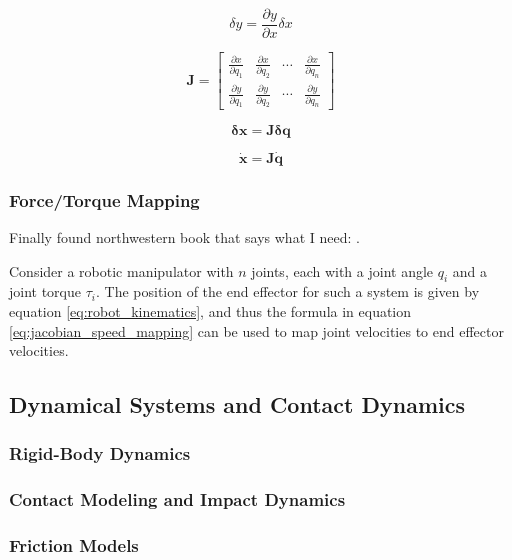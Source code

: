 \begin{equation}
    \label{eq:infinitesimal_change}
    \delta  y = \frac{\partial y}{\partial x} \delta x
\end{equation}

\begin{equation}
    \label{eq:jacobian}
    \mathbf{J} = \begin{bmatrix}
        \frac{\partial x}{\partial q_1} & \frac{\partial x}{\partial q_2} & \cdots & \frac{\partial x}{\partial q_n} \\
        \frac{\partial y}{\partial q_1} & \frac{\partial y}{\partial q_2} & \cdots & \frac{\partial y}{\partial q_n}
    \end{bmatrix}
\end{equation}

\begin{equation}
    \label{eq:jacobian_pos_mapping}
    \mathbf{\delta x} = \mathbf{J}\mathbf{\delta q}
\end{equation}

\begin{equation}
    \label{eq:jacobian_speed_mapping}
    \mathbf{\dot x} = \mathbf{J}\mathbf{\dot q}
\end{equation}

    \subsubsection{Force/Torque Mapping}

    Finally found northwestern book that says what I need: \cite{NorthWestern_Robotics}. 

    Consider a robotic manipulator with $n$ joints, each with a joint angle $q_i$ and a joint torque $\tau_i$. The position of the end effector for such a system is given by equation \ref{eq:robot_kinematics}, and thus the formula in equation \ref{eq:jacobian_speed_mapping} can be used to map joint velocities to end effector velocities. 

    


\subsection{Dynamical Systems and Contact Dynamics}
    \subsubsection{Rigid-Body Dynamics}
    \subsubsection{Contact Modeling and Impact Dynamics}
    \subsubsection{Friction Models}
